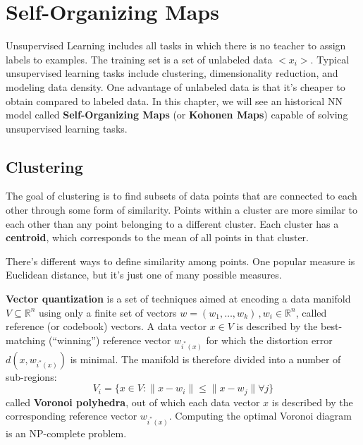 \chapter{Self-Organizing Maps}

 Unsupervised Learning includes all tasks in which there is no teacher to assign labels to examples. The training set is a set of unlabeled data $<x_i>$. Typical unsupervised learning tasks include clustering, dimensionality reduction, and modeling data density. One advantage of unlabeled data is that it's cheaper to obtain compared to labeled data. In this chapter, we will see an historical NN model called \textbf{Self-Organizing Maps} (or \textbf{Kohonen Maps}) capable of solving unsupervised learning tasks. 

\section{Clustering}

The goal of clustering is to find subsets of data points that are connected to each other through some form of similarity. Points within a cluster are more similar to each other than any point belonging to a different cluster. Each cluster has a \textbf{centroid}, which corresponds to the mean of all points in that cluster.

There's different ways to define similarity among points. One popular measure is Euclidean distance, but it's just one of many possible measures.

\textbf{Vector quantization} is a set of techniques aimed at encoding a data manifold $V \subseteq \mathbb{R}^n$ using only a finite set of vectors $w = (w_1,\dots,w_k) \,, w_i \in \mathbb{R}^n$, called reference (or codebook) vectors. A data vector $x \in V$ is described by the best-matching (``winning'') reference vector $w_{i^*(x)}$ for which the distortion error $d(x, w_{i^*(x)})$ is minimal. The manifold is therefore divided into a number of sub-regions:
\begin{equation*}
    V_i = \{ x \in V : \|x - w_i\| \leq \|x - w_j\| \forall j \}
\end{equation*}
called \textbf{Voronoi polyhedra}, out of which each data vector $x$ is described by the corresponding reference vector $w_{i^*(x)}$. Computing the optimal Voronoi diagram is an NP-complete problem.

